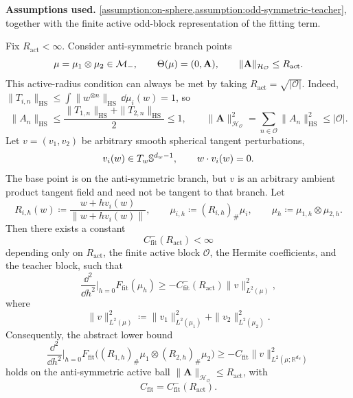 \begin{lemma}
\label{lem:fitting-curvature-lower-bound-Mminus-smoothness}
\textbf{Assumptions used.}
\cref{assumption:on-sphere,assumption:odd-symmetric-teacher},
together with the finite active odd-block representation of the fitting term.

Fix \(R_{\mathrm{act}}<\infty\).  Consider anti-symmetric branch points
\[
    \mu=\mu_1\otimes\mu_2\in\mathcal{M}_{-},
    \qquad
    \Theta(\mu)=(0,\mathbf A),
    \qquad
    \|\mathbf A\|_{\mathcal H_{\mathcal O}}\le R_{\mathrm{act}}.
\]
This active-radius condition can always be met by taking
\(R_{\mathrm{act}}=\sqrt{|\mathcal O|}\).  Indeed,
\(\|T_{i,n}\|_{\mathrm{HS}}\le
\int\|w^{\otimes n}\|_{\mathrm{HS}}\,\dd\mu_i(w)=1\), so
\[
 \|A_n\|_{\mathrm{HS}}
 \le\frac{\|T_{1,n}\|_{\mathrm{HS}}+\|T_{2,n}\|_{\mathrm{HS}}}{2}\le1,
 \qquad
 \|\mathbf A\|_{\mathcal H_{\mathcal O}}^2
 =\sum_{n\in\mathcal O}\|A_n\|_{\mathrm{HS}}^2\le|\mathcal O|.
\]
Let \(v=(v_1,v_2)\) be arbitrary smooth spherical tangent perturbations,
\[
    v_i(w)\in T_w\mathbb{S}^{d_w-1},
    \qquad
    w\cdot v_i(w)=0.
\]
The base point is on the anti-symmetric branch, but \(v\) is an arbitrary
ambient product tangent field and need not be tangent to that branch.
Let
\[
    R_{i,h}(w)
    \coloneq
    \frac{w+h v_i(w)}{\|w+h v_i(w)\|},
    \qquad
    \mu_{i,h}\coloneq (R_{i,h})_\#\mu_i,
    \qquad
    \mu_h\coloneq \mu_{1,h}\otimes\mu_{2,h}.
\]
Then there exists a constant
\[
    C_{\mathrm{fit}}^{-}(R_{\mathrm{act}})<\infty
\]
depending only on \(R_{\mathrm{act}}\), the finite active block \(\mathcal O\), the Hermite coefficients, and the teacher block, such that
\begin{equation}
\label{eq:fitting-curvature-lower-bound-Mminus-derived}
    \frac{\dd^2}{\dd h^2}\Big|_{h=0}
    F_{\mathrm{fit}}(\mu_h)
    \ge
    -C_{\mathrm{fit}}^{-}(R_{\mathrm{act}})
    \|v\|_{L^2(\mu)}^2,
\end{equation}
where
\[
    \|v\|_{L^2(\mu)}^2
    \coloneq
    \|v_1\|_{L^2(\mu_1)}^2
    +
    \|v_2\|_{L^2(\mu_2)}^2.
\]
Consequently, the abstract lower bound
\[
    \frac{\dd^2}{\dd h^2}\Big|_{h=0}
    F_{\mathrm{fit}}\bigl((R_{1,h})_\#\mu_1\otimes(R_{2,h})_\#\mu_2\bigr)
    \ge
    -C_{\mathrm{fit}}\|v\|_{L^2(\mu;\mathbb R^{d_w})}^2
\]
holds on the anti-symmetric active ball
\(\|\mathbf A\|_{\mathcal H_{\mathcal O}}\le R_{\mathrm{act}}\), with
\[
    C_{\mathrm{fit}}
    =
    C_{\mathrm{fit}}^{-}(R_{\mathrm{act}}).
\]
\end{lemma}

